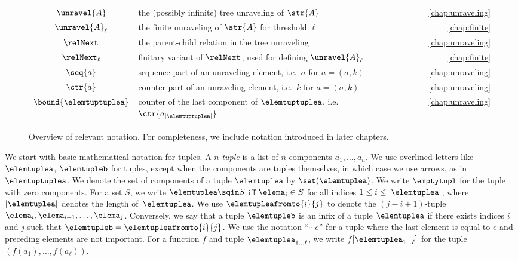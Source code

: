 \begin{figure}
\begin{tabularx}{\textwidth}{c X r}
    $\unravel{A}$ & the (possibly infinite) tree unraveling of $\str{A}$ & \cref{chap:unraveling} \\
    $\unravel{A}_{\ell}$ & the finite unraveling of $\str{A}$ for threshold $\ell$ & \cref{chap:finite} \\
    $\relNext$ & the parent-child relation in the tree unraveling & \cref{chap:unraveling} \\
    $\relNext_{\ell}$ & finitary variant of $\relNext$, used for defining $\unravel{A}_{\ell}$ & \cref{chap:finite} \\
    $\seq{a}$ & sequence part of an unraveling element, i.e.\ $\sigma$ for $a = (\sigma, k)$ & \cref{chap:unraveling} \\
    $\ctr{a}$ & counter part of an unraveling element, i.e.\ $k$ for $a = (\sigma, k)$ & \cref{chap:unraveling} \\
    $\bound{\elemtuptuplea}$ & counter of the last component of $\elemtuptuplea$, i.e.\ $\ctr{a_{|\elemtuptuplea|}}$ & \cref{chap:unraveling} \\
  \end{tabularx}
  \egroup
  \caption{Overview of relevant notation. For completeness, we include notation introduced in later chapters.}%
  \label{fig:notation-quickref}
\end{figure}

We start with basic mathematical notation for tuples.
A $n$-\emph{tuple} is a list of $n$ components $a_{1}, \ldots{}, a_{n}$.
We use overlined letters like $\elemtuplea$, $\elemtupleb$ for tuples, except when the components are tuples themselves, in which case we use arrows, as in $\elemtuptuplea$.
We denote the set of components of a tuple $\elemtuplea$ by $\set(\elemtuplea)$.
We write $\emptytupl$ for the tuple with zero components.
For a set $S$, we write $\elemtuplea \sqin S$ iff $\elema_i \in S$ for all indices $1 \leq i \leq |\elemtuplea|$, where $|\elemtuplea|$ denotes the length of~$\elemtuplea$.
We use $\elemtupleafromto{i}{j}$ to denote the $(j{-}i{+}1)$-tuple $\elema_i, \elema_{i+1}, \ldots, \elema_j$.
Conversely, we say that a tuple $\elemtupleb$ is an infix of a tuple $\elemtuplea$ if there exists indices $i$ and $j$ such that $\elemtupleb = \elemtupleafromto{i}{j}$.
We use the notation ``$\cdots e$'' for a tuple where the last element is equal to $e$ and preceding elements are not important.
For a function $f$ and tuple $\elemtuplea_{1\ldots\ell}$, we write $f[\elemtuplea_{1\ldots\ell}]$ for the tuple $(f(a_{1}), \ldots, f(a_{\ell}))$.

